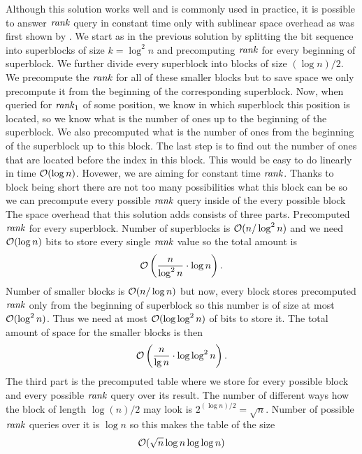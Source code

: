 Although this solution works well and is commonly used in practice, it is possible to
answer $\mathit{rank}$ query in constant time only with sublinear space overhead as was first
shown by \cite{okanohara2007practical}. We start as in the previous solution by splitting
the bit sequence into superblocks of size $k=\log^2 n$ and precomputing $\mathit{rank}$ for every
beginning of superblock. We further divide every superblock into blocks of size $(\log n)/2$.
We precompute the $\mathit{rank}$ for all of these smaller blocks but to save space we only precompute
it from the beginning of the corresponding superblock. Now, when queried for $\mathit{rank}_1$
of some position, we know in which superblock this position is located, so we know what is the
number of ones up to the beginning of the superblock. We also
precomputed what is the number of ones from the beginning of the superblock up to this block.
The last step is to find out the number of ones that are located before the index in this
block. This would be easy to do linearly in time $\mathcal{O}(\log n)$. Hovewer, we are aiming for
constant time $\mathit{rank}$. Thanks to block being short there are not too many possibilities what
this block can be so we can precompute every possible $\mathit{rank}$ query inside of the every possible
block The space overhead that this solution adds consists of three parts.
Precomputed $\mathit{rank}$ for every superblock. Number of superblocks is $\mathcal{O}(n/\log^2 n)$ and we
need $\mathcal{O}(\log n)$ bits to store every single $\mathit{rank}$ value so the total amount is
\begin{equation}
    \mathcal{O}\left(\frac{n}{\log^2 n}\cdot \log n\right).
    \label{eq:rank_space_1}
\end{equation}
Number of smaller blocks is $\mathcal{O}(n/\log n)$ but now, every block stores precomputed $\mathit{rank}$
only from the beginning of superblock so this number is of size at most $\mathcal{O}(\log^2 n)$. Thus
we need at most $\mathcal{O}(\log\log^2 n)$ of bits to store it. The total amount of space for the
smaller blocks is then
\begin{equation}
    \mathcal{O}\left(\frac{n}{\lg n}\cdot \log\log^2 n\right).
    \label{eq:rank_space_2}
\end{equation}
The third part is the precomputed table where we store for every possible block and every
possible $\mathit{rank}$ query over its result. The number of different ways how the block of length
$\log(n)/2$ may look is $2^{(\log n)/2} = \sqrt{n}$. Number of possible $\mathit{rank}$
queries over it is $\log n$ so this makes the table of the size
\begin{equation}
    \mathcal{O}(\sqrt{n}\log n\log\log n)
    \label{eq:rank_space_3}
\end{equation}
